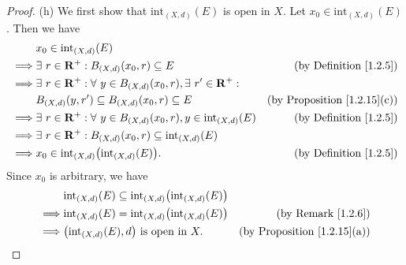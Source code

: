 \begin{proof}{(h)}
    We first show that \(\text{int}_{(X, d)}(E)\) is open in \(X\).
    Let \(x_0 \in \text{int}_{(X, d)}(E)\).
    Then we have
    \begin{align*}
                 & x_0 \in \text{int}_{(X, d)}(E)                                                                                                            \\
        \implies & \exists\ r \in \mathbf{R}^+ : B_{(X, d)}(x_0, r) \subseteq E                                    & \text{(by Definition \ref{1.2.5})}      \\
        \implies & \exists\ r \in \mathbf{R}^+ : \forall\ y \in B_{(X, d)}(x_0, r), \exists\ r' \in \mathbf{R}^+ :                                           \\
                 & B_{(X, d)}(y, r') \subseteq B_{(X, d)}(x_0, r) \subseteq E                                      & \text{(by Proposition \ref{1.2.15}(c))} \\
        \implies & \exists\ r \in \mathbf{R}^+ : \forall\ y \in B_{(X, d)}(x_0, r), y \in \text{int}_{(X, d)}(E)   & \text{(by Definition \ref{1.2.5})}      \\
        \implies & \exists\ r \in \mathbf{R}^+ : B_{(X, d)}(x_0, r) \subseteq \text{int}_{(X, d)}(E)                                                         \\
        \implies & x_0 \in \text{int}_{(X, d)}\big(\text{int}_{(X, d)}(E)\big).                                    & \text{(by Definition \ref{1.2.5})}
    \end{align*}
    Since \(x_0\) is arbitrary, we have
    \begin{align*}
                 & \text{int}_{(X, d)}(E) \subseteq \text{int}_{(X, d)}\big(\text{int}_{(X, d)}(E)\big)                                           \\
        \implies & \text{int}_{(X, d)}(E) = \text{int}_{(X, d)}\big(\text{int}_{(X, d)}(E)\big)         & \text{(by Remark \ref{1.2.6})}          \\
        \implies & \big(\text{int}_{(X, d)}(E), d\big) \text{ is open in } X.                           & \text{(by Proposition \ref{1.2.15}(a))}
    \end{align*}


\end{proof}
